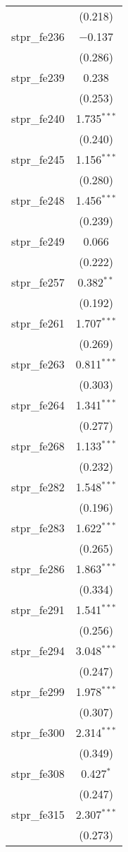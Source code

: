 \begin{table}[!htbp]
\begin{tabular}{@{\extracolsep{5pt}}lc}
  & (0.218) \\ 
  stpr\_fe236 & $-$0.137 \\ 
  & (0.286) \\ 
  stpr\_fe239 & 0.238 \\ 
  & (0.253) \\ 
  stpr\_fe240 & 1.735$^{***}$ \\ 
  & (0.240) \\ 
  stpr\_fe245 & 1.156$^{***}$ \\ 
  & (0.280) \\ 
  stpr\_fe248 & 1.456$^{***}$ \\ 
  & (0.239) \\ 
  stpr\_fe249 & 0.066 \\ 
  & (0.222) \\ 
  stpr\_fe257 & 0.382$^{**}$ \\ 
  & (0.192) \\ 
  stpr\_fe261 & 1.707$^{***}$ \\ 
  & (0.269) \\ 
  stpr\_fe263 & 0.811$^{***}$ \\ 
  & (0.303) \\ 
  stpr\_fe264 & 1.341$^{***}$ \\ 
  & (0.277) \\ 
  stpr\_fe268 & 1.133$^{***}$ \\ 
  & (0.232) \\ 
  stpr\_fe282 & 1.548$^{***}$ \\ 
  & (0.196) \\ 
  stpr\_fe283 & 1.622$^{***}$ \\ 
  & (0.265) \\ 
  stpr\_fe286 & 1.863$^{***}$ \\ 
  & (0.334) \\ 
  stpr\_fe291 & 1.541$^{***}$ \\ 
  & (0.256) \\ 
  stpr\_fe294 & 3.048$^{***}$ \\ 
  & (0.247) \\ 
  stpr\_fe299 & 1.978$^{***}$ \\ 
  & (0.307) \\ 
  stpr\_fe300 & 2.314$^{***}$ \\ 
  & (0.349) \\ 
  stpr\_fe308 & 0.427$^{*}$ \\ 
  & (0.247) \\ 
  stpr\_fe315 & 2.307$^{***}$ \\ 
  & (0.273) \\ 

\end{tabular}
\end{table}
